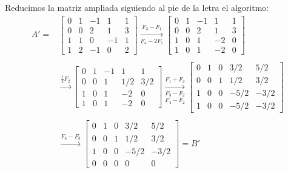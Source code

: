 \documentclass[handout]{beamer} %
\renewcommand{\_}[1]{_{\left[ #1 \right]}}
\renewcommand{\^}[1]{^{\left[ #1 \right]}}
\begin{document}
\begin{frame}

Reducimos la matriz ampliada siguiendo al pie de la letra el algoritmo:\pause
{\footnotesize
	\begin{align*}
	A'=&
	\left[
	\begin{array}{rrrr|r}
	0& 1 & -1 & 1 & 1 \\
	0&0& 2& 1 & 3 \\
	1&1& 0&-1 & 1 \\
	1&2& -1& 0 & 2
	\end{array}
	\right]
		\underset{F_4-2F_1}{\stackrel{F_3- F_1}{\longrightarrow}}
	\left[
	\begin{array}{rrrr|r}
	0& 1 & -1 & 1 & 1 \\
	0&0& 2& 1 & 3 \\
	1&0& 1&-2 & 0 \\
	1&0& 1& -2 & 0
	\end{array}
	\right]
	\\
	&
	\\
	&	\overset{\frac{1}{2}F_2}{\longrightarrow}
	\left[
	\begin{array}{rrrr|r}
	0& 1 & -1 & 1 & 1 \\
	0&0& 1& {1}/{2} & {3}/{2} \\
	1&0& 1&-2 & 0 \\
	1&0& 1& -2 & 0
	\end{array}
	\right]
		\underset{F_4-F_2}{\underset{F_3-F_2}{\stackrel{F_1+ F_2}{\longrightarrow}}}
	\left[
	\begin{array}{rrrr|r}
	0& 1 & 0 & {3}/{2} &{5}/{2} \\
	0&0& 1& {1}/{2} & {3}/{2} \\
	1&0& 0&-{5}/{2} & -{3}/{2} \\
	1&0& 0& -{5}/{2} & -{3}/{2}
	\end{array}
	\right]	\\
	&	
	\\
	&	\overset{F_4-F_3}{\longrightarrow}
	\left[
	\begin{array}{rrrr|r}
	0& 1 & 0 & {3}/{2} &{5}/{2} \\
	0&0& 1& {1}/{2} & {3}/{2} \\
	1&0& 0&-{5}/{2} & -{3}/{2} \\
	0&0& 0&0 & 0
	\end{array}
	\right] =B'
	\end{align*}
} 
\end{frame}
\end{document}
